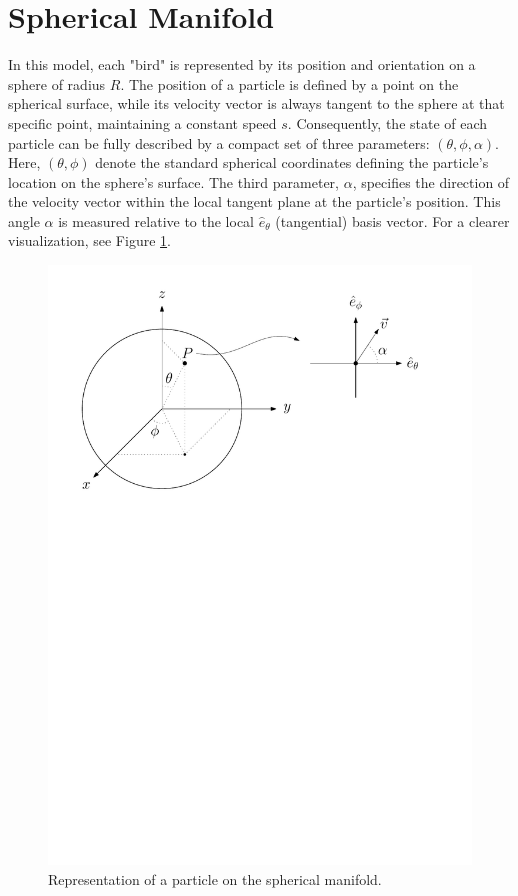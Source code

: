 \documentclass[12pt,a4paper]{article}
\begin{document}
\section{Spherical Manifold}
In this model, each "bird" is represented by its position and orientation on a sphere of radius \(R\). The position of a particle is defined by a point on the spherical surface, while its velocity vector is always tangent to the sphere at that specific point, maintaining a constant speed \(s\). Consequently, the state of each particle can be fully described by a compact set of three parameters: \((\theta, \phi, \alpha)\). Here, \((\theta, \phi)\) denote the standard spherical coordinates defining the particle's location on the sphere's surface. The third parameter, \(\alpha\), specifies the direction of the velocity vector within the local tangent plane at the particle's position. This angle \(\alpha\) is measured relative to the local \(\hat{e}_\theta\) (tangential) basis vector. For a clearer visualization, see Figure \ref{fig:particle_representation}.
\begin{figure}[H]
    \centering
    \includegraphics[width=0.6\linewidth]{./Figures/particle.pdf}
    \caption{Representation of a particle on the spherical manifold.}
    \label{fig:particle_representation}
\end{figure}
\end{document}
